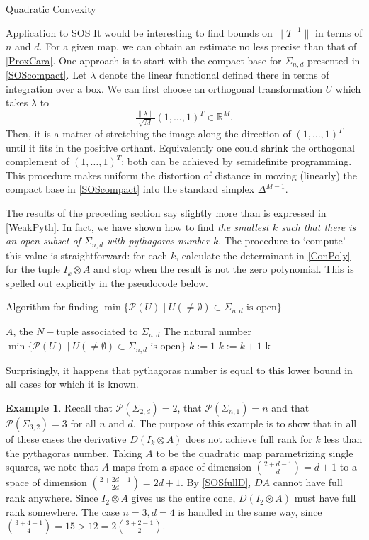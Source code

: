 \documentclass[12pt,oneside,final]{ucthesisucsbmath2010}
\newcommand{\R}{\mathbb{R}}
\newcommand{\p}{\mathcal{P}}
\newcommand{\snd}{\Sigma_{n,d}}
\theoremstyle{definition}
\newtheorem{examp}[thm]{Example}
\begin{document}
\begin{chapter}{Quadratic Convexity}
\begin{section}{Application to SOS}
It would be interesting to find bounds on $\|T^{-1}\|$ in terms of $n$ and $d$. For a given map, we can obtain an estimate no less precise than that of \ref{ProxCara}. One approach is to start with the compact base for $\snd$ presented in \ref{SOScompact}. Let $\lambda$ denote the linear functional defined there in terms of integration over a box. We can first choose an orthogonal transformation $U$ which takes $\lambda$ to \[\tfrac{\|\lambda\|}{\sqrt{M}}(1,\ldots,1)^T \in \R^M.\] Then, it is a matter of stretching the image along the direction of $(1,\ldots,1)^T$ until it fits in the positive orthant. Equivalently one could shrink the orthogonal complement of $(1,\ldots,1)^T$; both can be achieved by semidefinite programming. This procedure makes uniform the distortion of distance in moving (linearly) the compact base in \ref{SOScompact} into the standard simplex $\Delta^{M-1}$.

The results of the preceding section say slightly more than is expressed in \ref{WeakPyth}. In fact, we have shown how to find \emph{the smallest $k$ such that there is an open subset of $\snd$ with pythagoras number $k$}. The procedure to `compute' this value is straightforward: for each $k$, calculate the determinant in \ref{ConPoly} for the tuple $I_k\otimes A$ and stop when the result is not the zero polynomial. This is spelled out explicitly in the pseudocode below.

\begin{algorithm}
\caption*{Algorithm for finding $\min \{\p(U) \mid U(\neq \emptyset) \subset \snd \text{ is open}\}$}
\begin{algorithmic} 
\REQUIRE $A$, the $N-$tuple associated to $\snd$
\ENSURE The natural number $\min \{\p(U) \mid U(\neq \emptyset) \subset \snd \text{ is open}\}$
\STATE $k:=1$
\WHILE{$\det [D(I_k \otimes A)(x)D(I_k \otimes A)(x)^T]  = 0 \in \R[x_1,\ldots,x_{kN}]$}
\STATE $k:=k+1$
\ENDWHILE
\RETURN k
\end{algorithmic}
\end{algorithm}


Surprisingly, it happens that pythagoras number is equal to this lower bound in all cases for which it is known. 

\begin{examp}Recall that $\p(\Sigma_{2,d})=2$, that $\p(\Sigma_{n,1}) = n$ and that $\p(\Sigma_{3,2})=3$ for all $n$ and $d$. The purpose of this example is to show that in all of these cases the derivative $D(I_k\otimes A)$ does not achieve full rank for $k$ less than the pythagoras number. Taking $A$ to be the quadratic map parametrizing single squares, we note that $A$ maps from a space of dimension $\binom{2+d-1}{d} = d+1$ to a space of dimension $\binom{2+2d-1}{2d} = 2d+1$. By \ref{SOSfullD}, $DA$ cannot have full rank anywhere. Since $I_2\otimes A$ gives us the entire cone, $D(I_2\otimes A)$ must have full rank somewhere. The case $n=3,d=4$ is handled in the same way, since $\binom{3+4-1}{4} = 15 > 12 = 2\binom{3+2-1}{2}$.


\end{examp}
\end{section}
\end{chapter}
\end{document}
